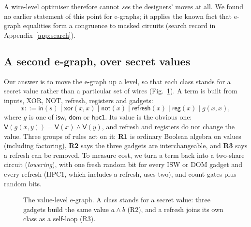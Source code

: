 \documentclass[conference]{IEEEtran}
\newcommand{\val}[1]{\mathsf{V}(#1)}
\newcommand{\rf}{\mathsf{refresh}}
\newcommand{\reg}{\mathsf{reg}}
\newcommand{\isw}{\mathsf{isw}}
\newcommand{\dom}{\mathsf{dom}}
\newcommand{\hpc}{\mathsf{hpc1}}
\begin{document}
A wire-level optimiser therefore cannot \emph{see} the designers' moves at all. We found no earlier statement of this point for e-graphs; it applies the known fact that e-graph equalities form a congruence \cite{suciu2025semantic} to masked circuits (search record in Appendix~\ref{app:search}).

\subsection{A second e-graph, over secret values}
Our answer is to move the e-graph up a level, so that each class stands for a secret value rather than a particular set of wires (Fig.~\ref{fig:value}). A term is built from inputs, XOR, NOT, refresh, registers and gadgets:
\[
x ::= \mathsf{in}(s)\mid \mathsf{xor}(x,x)\mid\mathsf{not}(x)\mid\rf(x)\mid\reg(x)\mid g(x,x),
\]
where $g$ is one of $\isw$, $\dom$ or $\hpc$. Its value is the obvious one: $\val{g(x,y)}=\val x\wedge\val y$, and refresh and registers do not change the value. Three groups of rules act on it: \textbf{R1} is ordinary Boolean algebra on values (including factoring), \textbf{R2} says the three gadgets are interchangeable, and \textbf{R3} says a refresh can be removed. To measure cost, we turn a term back into a two-share circuit (\emph{lowering}), with one fresh random bit for every ISW or DOM gadget and every refresh (HPC1, which includes a refresh, uses two), and count gates plus random bits.

\begin{figure}[!t]
\centering
{}
\caption{The value-level e-graph. A class stands for a secret value: three gadgets build the same value $a\wedge b$ (R2), and a refresh joins its own class as a self-loop (R3).}\label{fig:value}
\end{figure}
\end{document}
